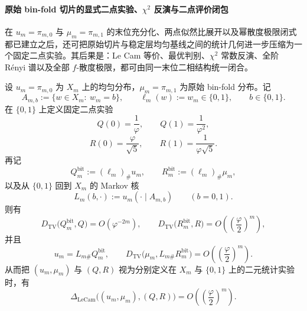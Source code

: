 \paragraph{原始 bin-fold 切片的显式二点实验、\texorpdfstring{$\chi^2$}{chi2} 反演与二点评价闭包}
在 \(u_m=\pi_{m,0}\) 与 \(\mu_m=\pi_{m,1}\) 的末位充分化、两点似然比展开以及幂散度极限闭式都已建立之后，还可把原始切片与稳定层均匀基线之间的统计几何进一步压缩为一个固定二点实验。其后果是：Le Cam 等价、最优判别、\(\chi^2\) 常数反演、全阶 Rényi 谱以及全部 \(f\)-散度极限，都可由同一末位二相结构统一闭合。

\begin{theorem}\label{thm:xi-time-part9sa-uniform-baseline-fixed-binary-experiment}
设 \(u_m=\pi_{m,0}\) 为 \(X_m\) 上的均匀分布，\(\mu_m=\pi_{m,1}\) 为原始 bin-fold 分布。记
\[
A_{m,b}:=\{w\in X_m:\ w_m=b\},
\qquad
\ell_m(w):=w_m\in\{0,1\},
\qquad
b\in\{0,1\}.
\]
在 \(\{0,1\}\) 上定义固定二点实验
\[
Q(0)=\frac1\varphi,
\qquad
Q(1)=\frac1{\varphi^2},
\]
\[
R(0)=\frac{\varphi}{\sqrt5},
\qquad
R(1)=\frac{1}{\varphi\sqrt5}.
\]
再记
\[
Q_m^{\mathrm{bit}}:=(\ell_m)_\#u_m,
\qquad
R_m^{\mathrm{bit}}:=(\ell_m)_\#\mu_m,
\]
以及从 \(\{0,1\}\) 回到 \(X_m\) 的 Markov 核
\[
L_m(b,\cdot):=u_m(\cdot\mid A_{m,b})
\qquad (b=0,1).
\]
则有
\[
D_{\mathrm{TV}}\bigl(Q_m^{\mathrm{bit}},Q\bigr)=O(\varphi^{-2m}),
\qquad
D_{\mathrm{TV}}\bigl(R_m^{\mathrm{bit}},R\bigr)
=
O\!\left(\left(\frac{\varphi}{2}\right)^m\right),
\]
并且
\[
u_m=L_{m\#}Q_m^{\mathrm{bit}},
\qquad
D_{\mathrm{TV}}\bigl(\mu_m,L_{m\#}R_m^{\mathrm{bit}}\bigr)
=
O\!\left(\left(\frac{\varphi}{2}\right)^m\right).
\]
从而把 \((u_m,\mu_m)\) 与 \((Q,R)\) 视为分别定义在 \(X_m\) 与 \(\{0,1\}\) 上的二元统计实验时，有
\[
\Delta_{\mathrm{LeCam}}\bigl((u_m,\mu_m),(Q,R)\bigr)
=
O\!\left(\left(\frac{\varphi}{2}\right)^m\right).
\]
\end{theorem}
